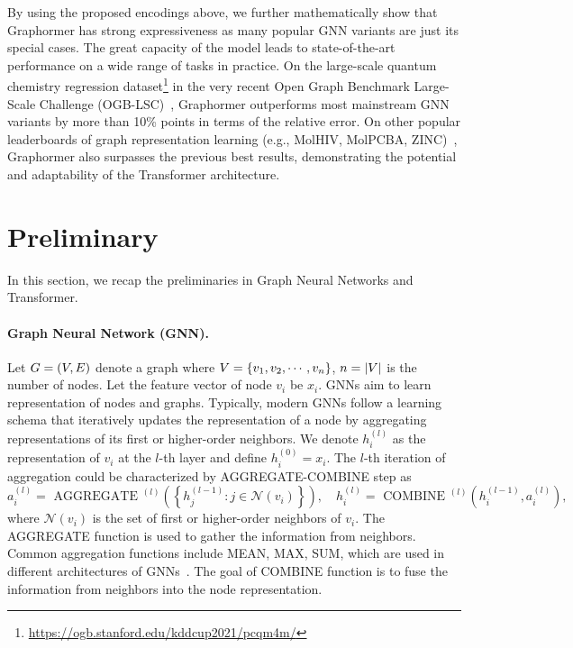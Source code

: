 \documentclass{article}
\begin{document}
By using the proposed encodings above, we further mathematically show that Graphormer has strong expressiveness as many popular GNN variants are just its special cases. The great capacity of the model leads to state-of-the-art performance on a wide range of tasks in practice. On the large-scale quantum chemistry regression dataset\footnote{\url{https://ogb.stanford.edu/kddcup2021/pcqm4m/}} in the very recent Open Graph Benchmark Large-Scale Challenge (OGB-LSC)~\cite{hu2021ogb}, Graphormer outperforms most mainstream GNN variants by more than 10\% points in terms of the relative error. On other popular leaderboards of graph representation learning (e.g., MolHIV, MolPCBA, ZINC)~\cite{hu2020open,dwivedi2020benchmarking}, Graphormer also surpasses the previous best results, demonstrating the potential and adaptability of the Transformer architecture. 



\section{Preliminary}
In this section, we recap the preliminaries in Graph Neural Networks and Transformer.

\paragraph{Graph Neural Network (GNN).} 
Let $G = \left(V, E\right)$ denote a graph where $V = \left\{v_1, v_2, \cdots, v_n\right\}$, $n = \left|V\right|$ is the number of nodes. Let the feature vector of node $v_i$ be $x_i$. GNNs aim to learn representation of nodes and graphs. Typically, modern GNNs follow a learning schema that iteratively updates the representation of a node by aggregating representations of its first or higher-order neighbors. We denote $h^{(l)}_i$ as the representation of $v_i$ at the $l$-th layer and define $h_i^{(0)} = x_i$. The $l$-th iteration of aggregation could be characterized by AGGREGATE-COMBINE step as
\begin{equation}
a_{i}^{(l)}=\text { AGGREGATE }^{(l)}\left(\left\{h_{j}^{(l-1)}: j \in \mathcal{N}(v_i)\right\}\right), \quad
h_{i}^{(l)}=\text { COMBINE }^{(l)}\left(h_{i}^{(l-1)}, a_{i}^{(l)}\right) ,
\label{eqn:agg-comb}
\end{equation}
where $\mathcal{N}(v_i)$ is the set of first or higher-order neighbors of $v_i$. The AGGREGATE function is used to gather the information from neighbors. Common aggregation functions include MEAN, MAX, SUM, which are used in different architectures of GNNs~\cite{kipf2016semi,hamilton2017inductive,velivckovic2018graph,xu2018how}. The goal of COMBINE function is to fuse the information from neighbors into the node representation. 
\end{document}
